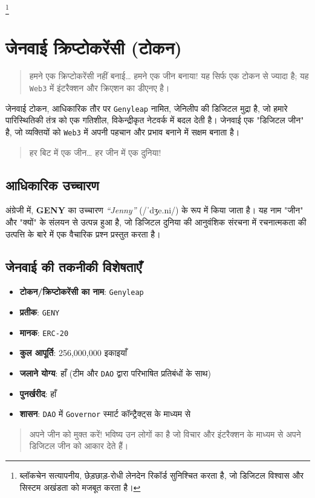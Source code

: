 \documentclass[a4paper,12pt,openany]{book}
\begin{document}
\footnote{ब्लॉकचेन सत्यापनीय, छेड़छाड़-रोधी लेनदेन रिकॉर्ड सुनिश्चित करता है, जो डिजिटल विश्वास और सिस्टम अखंडता को मजबूत करता है।}

\chapter{जेनवाई क्रिप्टोकरेंसी (टोकन)}
\begin{quote}
हमने एक क्रिप्टोकरेंसी नहीं बनाई… हमने एक जीन बनाया! यह सिर्फ एक टोकन से ज्यादा है; यह \texttt{Web3} में इंटरैक्शन और क्रिएशन का डीएनए है।
\end{quote}
जेनवाई टोकन, आधिकारिक तौर पर \texttt{Genyleap} नामित, जेनिलीप की डिजिटल मुद्रा है, जो हमारे पारिस्थितिकी तंत्र को एक गतिशील, विकेन्द्रीकृत नेटवर्क में बदल देती है। जेनवाई एक "डिजिटल जीन" है, जो व्यक्तियों को \texttt{Web3} में अपनी पहचान और प्रभाव बनाने में सक्षम बनाता है।
\begin{quote}
हर बिट में एक जीन… हर जीन में एक दुनिया!
\end{quote}

\section*{आधिकारिक उच्चारण}
अंग्रेजी में, \textbf{GENY} का उच्चारण \textit{``Jenny''} ({\ipafont /ˈdʒe.ni/}) के रूप में किया जाता है। यह नाम "जीन" और "क्यों" के संलयन से उत्पन्न हुआ है, जो डिजिटल दुनिया की आनुवंशिक संरचना में रचनात्मकता की उत्पत्ति के बारे में एक वैचारिक प्रश्न प्रस्तुत करता है।

\section*{जेनवाई की तकनीकी विशेषताएँ}
\begin{itemize}
    \item \textbf{टोकन/क्रिप्टोकरेंसी का नाम}: \texttt{Genyleap}
    \item \textbf{प्रतीक}: \texttt{GENY}
    \item \textbf{मानक}: \texttt{ERC-20}
    \item \textbf{कुल आपूर्ति}: 256,000,000 इकाइयाँ
    \item \textbf{जलाने योग्य}: हाँ (टीम और \texttt{DAO} द्वारा परिभाषित प्रतिबंधों के साथ)
    \item \textbf{पुनर्खरीद}: हाँ
    \item \textbf{शासन}: \texttt{DAO} में \texttt{Governor} स्मार्ट कॉन्ट्रैक्ट्स के माध्यम से
\end{itemize}
\vspace{-0.5em}
\begin{quote}
अपने जीन को मुक्त करें! भविष्य उन लोगों का है जो विचार और इंटरैक्शन के माध्यम से अपने डिजिटल जीन को आकार देते हैं।
\end{quote}
\newpage
\end{document}
